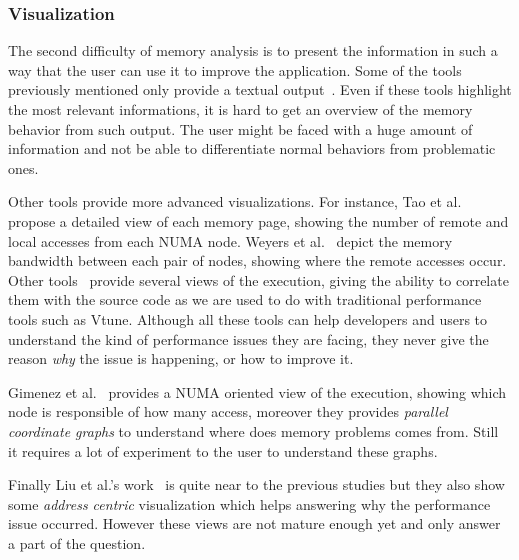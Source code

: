 \subsubsection{Visualization}

The second difficulty of memory analysis is to present the information in such
a way that the user can use it to improve the application. Some of the tools
previously mentioned only provide a textual
output~\cite{Lachaize12MemProf,McCurdy2010,Martonosi92MemSpy}. Even if these
tools highlight the most relevant informations, it is hard to get an overview
of the memory behavior from such output. The user might be faced with a huge
amount of information and not be able to differentiate normal behaviors from
problematic ones.


Other tools provide more advanced visualizations. For
instance, Tao et al.~\cite{Tao01Visualizing} propose a detailed view of each memory
page, showing the number of remote and local accesses from each NUMA node. Weyers et
al.~\cite{Weyers14Visualization} depict the memory bandwidth between each pair of nodes,
showing where the remote accesses occur. Other
tools~\cite{DeRose01Hardware,DeRose02SIGMA,Bosch00Rivet} provide several views
of the execution, giving the ability to correlate them with the source code as
we are used to do with traditional performance tools such as Vtune. Although
all these tools can help developers and users to understand the kind of
performance issues they are facing, they never give the reason \emph{why} the
issue is happening, or how to improve it.

Gimenez et al.~\cite{Gimenez14Dissecting} provides a NUMA oriented view of the
execution, showing which node is responsible of how many access, moreover they
provides \emph{parallel coordinate graphs} to understand where does memory
problems comes from. Still it requires a lot of experiment to the user to
understand these graphs.

Finally Liu et al.'s work~\cite{Liu14Tool} is quite near to the previous studies but
they also show some \emph{address centric} visualization which helps answering
why the performance issue occurred. However these views are not mature enough
yet and only answer a part of the question.


